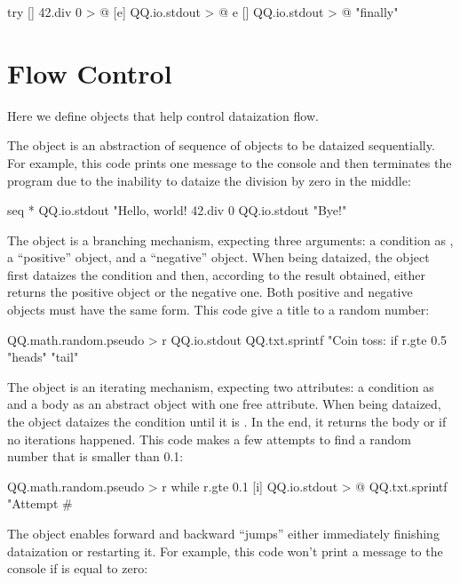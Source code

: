 \documentclass[sigplan,11pt,nonacm]{acmart}
\newcommand\aff[1]{\ff{\textcolor{gray}{$\star$}#1}}
\newcommand\adeff[1]{\aff{\textcolor{blue!50!black}{\textbf{#1}}}}
\begin{document}
\begin{ffcode}
try
  []
    42.div 0 > @
  [e]
    QQ.io.stdout > @
      e
  []
    QQ.io.stdout > @
      "finally"
\end{ffcode}

\section{Flow Control}\label{sec:flow}

Here we define objects that help control dataization flow.

The \adeff{seq} object is an abstraction of sequence of objects to be dataized
sequentially. For example, this code prints one message to the console and then
terminates the program due to the inability to dataize the division by zero in
the middle:

\begin{ffcode}
seq
  *
    QQ.io.stdout "Hello, world!
    42.div 0
    QQ.io.stdout "Bye!"
\end{ffcode}

The \adeff{if} object is a branching mechanism, expecting three arguments: a
condition as , a ``positive'' object, and a ``negative'' object. When
being dataized, the object \aff{if} first dataizes the condition and then,
according to the result obtained, either returns the positive object or the
negative one. Both positive and negative objects must have the same form. This
code give a title to a random number:

\begin{ffcode}
QQ.math.random.pseudo > r
QQ.io.stdout
  QQ.txt.sprintf
    "Coin toss: %
    if
      r.gte 0.5
      "heads"
      "tail"
\end{ffcode}

The \adeff{while} object is an iterating mechanism, expecting two attributes: a
condition as  and a body as an abstract object with one free
attribute. When being dataized, the object \aff{while} dataizes the condition
until it is . In the end, it returns the body or  if no
iterations happened. This code makes a few attempts to find a random number
that is smaller than 0.1:

\begin{ffcode}
QQ.math.random.pseudo > r
while
  r.gte 0.1
  [i]
    QQ.io.stdout > @
      QQ.txt.sprintf
        "Attempt #%
\end{ffcode}

The \adeff{goto} object enables forward and backward ``jumps'' either
immediately finishing dataization or restarting it. For example, this code
won't print a message to the console if  is equal to zero:
\end{document}
